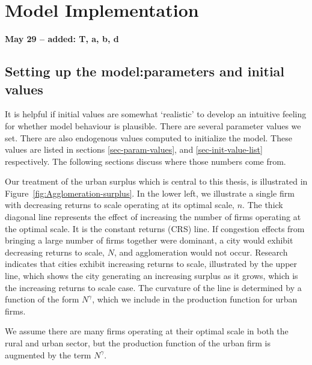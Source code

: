 \chapter[Model Implementation]{Model Implementation}
\textbf{May 29 -- added: T, a, b, d}
\section{Setting up the model:\newline parameters and initial values}
It is helpful if initial values are somewhat `realistic' to develop an intuitive feeling for whether model behaviour is plausible. 
There are several parameter values we set. There are also endogenous values computed to initialize the model. These values are listed in sections \ref{sec-param-values}, and \ref{sec-init-value-list} respectively. The following sections discuss where those numbers come from. %

Our treatment of the urban surplus which is central to this thesis, is illustrated in Figure~\ref{fig:Agglomeration-surplus}. In the lower left, we illustrate a single firm with decreasing returns to scale operating at its optimal scale, $n$. The thick diagonal line represents the effect of increasing the number of firms operating at the optimal scale. It is the constant returns (CRS) line. If congestion effects from bringing a large number of firms together were dominant, a city would exhibit decreasing returns to  scale,  $N$, and agglomeration would not occur. Research indicates that cities exhibit increasing returns to scale, illustrated by the upper line, which shows the city generating an increasing surplus as it grows, which is the increasing returns to scale case. The curvature of the line is determined by a function of the form $N^\gamma$, which we include in the production function for urban firms. 

We assume there are many firms operating at their optimal scale in both the rural and urban sector, but the production function of the urban firm is augmented by the term $N^\gamma$. 

